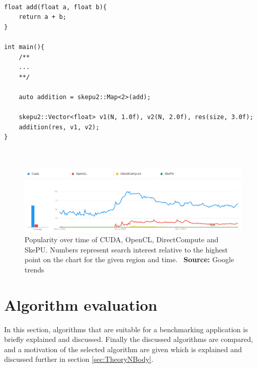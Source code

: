 \begin{lstlisting}[caption={SkePU vector addition}, label={lst:SkePUVectorAdd}, frame=single] 

float add(float a, float b){
	return a + b;
}

int main(){
    /**
    ...
    **/
    
    auto addition = skepu2::Map<2>(add);
    
    skepu2::Vector<float> v1(N, 1.0f), v2(N, 2.0f), res(size, 3.0f);
    addition(res, v1, v2);
}



\end{lstlisting}

\begin{figure}[!htbp]
    \centering
    \includegraphics[width=\textwidth]{Theory/Figs/GoogleTrendsComparison.png}
    \caption{Popularity over time of CUDA, OpenCL, DirectCompute and SkePU. Numbers represent search interest relative to the highest point on the chart for the given region and time. \ \textbf{Source:} Google trends}
    \label{fig:GoogleTrendsPopularity}
\end{figure}



\section{Algorithm evaluation}
In this section, algorithms that are suitable for a benchmarking application is briefly explained and discussed. Finally the discussed algorithms are compared, and a motivation of the selected algorithm are given which is explained and discussed further in section \ref{sec:TheoryNBody}.


